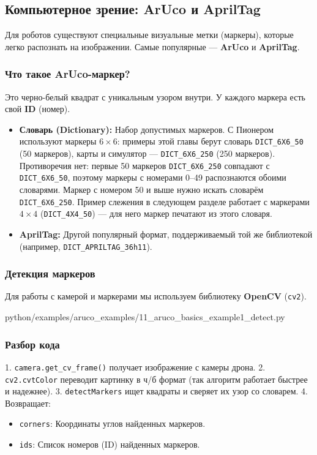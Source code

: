 \subsection{Компьютерное зрение: ArUco и AprilTag}

Для роботов существуют специальные визуальные метки (маркеры), которые легко распознать на изображении. Самые популярные — \textbf{ArUco} и \textbf{AprilTag}.

\subsubsection*{Что такое ArUco-маркер?}
Это черно-белый квадрат с уникальным узором внутри. У каждого маркера есть свой \textbf{ID} (номер).
\begin{itemize}
    \item \textbf{Словарь (Dictionary):} Набор допустимых маркеров. С Пионером используют маркеры $6\times6$: примеры этой главы берут словарь \texttt{DICT\_6X6\_50} (50 маркеров), карты и симулятор --- \texttt{DICT\_6X6\_250} (250 маркеров). Противоречия нет: первые 50 маркеров \texttt{DICT\_6X6\_250} совпадают с \texttt{DICT\_6X6\_50}, поэтому маркеры с номерами 0--49 распознаются обоими словарями. Маркер с номером 50 и выше нужно искать словарём \texttt{DICT\_6X6\_250}. Пример слежения в следующем разделе работает с маркерами $4\times4$ (\texttt{DICT\_4X4\_50}) --- для него маркер печатают из этого словаря.
    \item \textbf{AprilTag:} Другой популярный формат, поддерживаемый той же библиотекой (например, \texttt{DICT\_APRILTAG\_36h11}).
\end{itemize}

\subsubsection*{Детекция маркеров}
Для работы с камерой и маркерами мы используем библиотеку \textbf{OpenCV} (\texttt{cv2}).

\begin{codefile}[python]{python/examples/aruco_examples/11_aruco_basics_example1_detect.py}
\end{codefile}

\subsubsection*{Разбор кода}
1. \texttt{camera.get\_cv\_frame()} получает изображение с камеры дрона.
2. \texttt{cv2.cvtColor} переводит картинку в ч/б формат (так алгоритм работает быстрее и надежнее).
3. \texttt{detectMarkers} ищет квадраты и сверяет их узор со словарем.
4. Возвращает:
   \begin{itemize}
       \item \texttt{corners}: Координаты углов найденных маркеров.
       \item \texttt{ids}: Список номеров (ID) найденных маркеров.
   \end{itemize}

